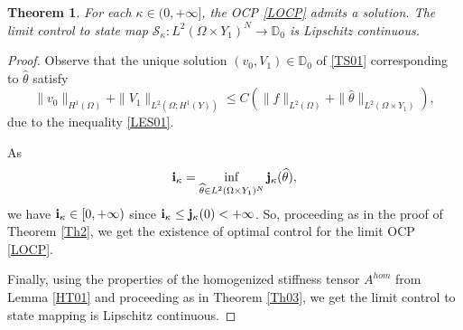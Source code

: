 \documentclass[11pt,a4paper]{article}
\numberwithin{equation}{section}
\def\O{\Omega}
\def\D{{\mathbb{D}}}
\def\Sc{{\mathcal{S}}}
\def\wh{\widehat }
\def\X{\times }
\def\Gi{{\bf i}}
\def\Gj{{\bf j}}
\newtheorem{theorem}{Theorem}[section]
\begin{document}
	\begin{theorem}
		For each $\kappa\in(0,+\infty]$, the OCP \eqref{LOCP} admits a solution. The limit control to state map $\Sc_\kappa:L^2(\O\X Y_1)^N\to \D_0$ is Lipschitz continuous.
	\end{theorem}
	\begin{proof}
		Observe that the unique solution $(v_0,V_1)\in\D_0$ of \eqref{TS01} corresponding to $\wh \theta$ satisfy
		$$\|v_0\|_{H^1(\O)}+\|V_1\|_{L^2(\O;H^1(Y))}\leq C(\|f\|_{L^2(\O)}+\|\wh \theta\|_{L^2(\O\X Y_1)}),$$
		due to the inequality \eqref{LES01}. 
		
		As
		$$\Gi_\kappa=\inf_{\wh \theta\in L^2(\O\X Y_1)^N}\Gj_\kappa(\wh \theta),$$
		we have $\Gi_\kappa\in[0,+\infty)$ since $\Gi_\kappa\leq \Gj_\kappa(0)<+\infty$. So, proceeding as in the proof of Theorem \ref{Th2}, we get the existence of optimal control for the limit OCP \eqref{LOCP}.
		
		Finally, using the properties of the homogenized stiffness tensor $A^{hom}$ from Lemma \ref{HT01} and proceeding as in Theorem \ref{Th03}, we get the limit control to state mapping is Lipschitz continuous.
	\end{proof}	
	
\end{document}

